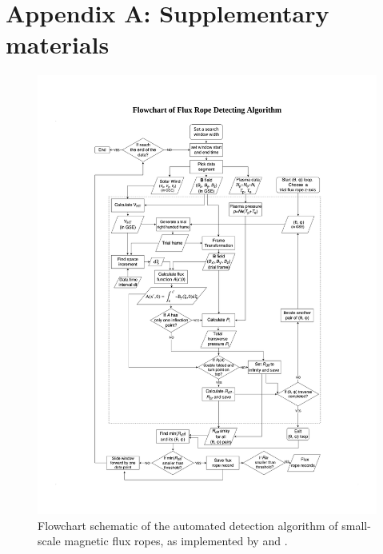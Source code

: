 \chapter{Appendix A: Supplementary materials}\label{ch:gs-flowchart}

\renewcommand{\thechapter}{A} 




\begin{figure}
    \centering
    \includegraphics[width=\textwidth]{Figures/Flowchart of Flux Rope Detecting Algorithm.pdf}
    \caption[Flowchart of GS-reconstruction based automated detection algorithm]{Flowchart schematic of the automated detection algorithm of small-scale magnetic flux ropes, as implemented by \cite{Hu:2018} and \cite{Zheng:2018}.}
    \label{fig:flowchart}
\end{figure}